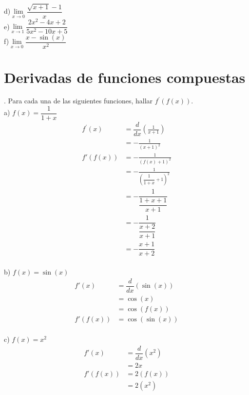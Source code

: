 \documentclass[letterpaper]{article}
\newcommand{\fp}[1]{#1^{\prime}}
\newcommand{\de}{\dfrac{d}{dx}}
\begin{document}
d)$ \lim\limits_{ x \rightarrow 0} \dfrac{\sqrt{x+1} -1}{x} $\\


e)$ \lim\limits_{ x \rightarrow 1} \dfrac{2x^{2}-4x+2}{5x^{2}-10x+5} $\\


f)$ \lim\limits_{ x \rightarrow 0} \dfrac{x- \sin(x)}{x^{2}} $\\


\section*{Derivadas de funciones compuestas}

. Para cada una de las siguientes funciones, hallar $ \fp{f} (f (x)) $.\\

a) $ f(x) = \dfrac{1}{1+x} $\\


\begin{align*}
	\fp{f}(x) &= \de \left(\frac{1}{x+1}\right)\\
	&= - \frac{1}{(x+1)^2}\\
	f'(f(x))	&= - \frac{1}{(f(x)+1)^2}\\
	&= - \frac{1}{\left(\dfrac{1}{1+x}+1\right)^2}\\
	& = - \dfrac{1}{\dfrac{1+x+1}{x+1}}\\
	& = - \dfrac{1}{\dfrac{x+2}{x+1}}\\
	& = - \dfrac{x+1}{x+2}\\
\end{align*}

b) $ f(x) = \sin(x) $\\

\begin{align*}
	f'(x) &= \de (\sin(x))\\
	&= \cos(x)\\
	&= \cos(f(x))\\
	f'(f(x))&= \cos(\sin(x))\\
\end{align*}

c) $ f(x) = x^{2} $\\

\begin{align*}
	f'(x) &= \de \left( x^2 \right)\\
	&= 2x\\
	f'(f(x)) &= 2(f(x))\\
	&= 2(x^{2})
\end{align*}
\end{document}
